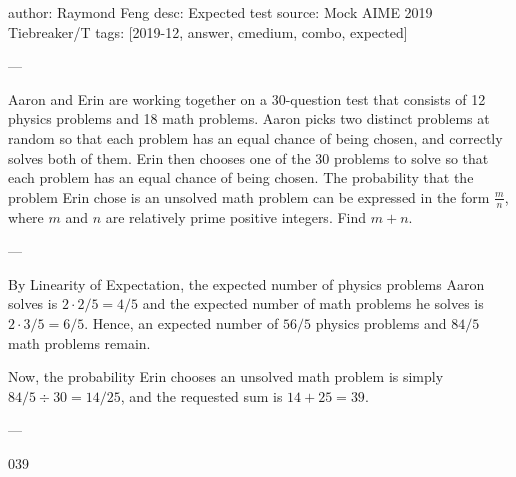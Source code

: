 author: Raymond Feng
desc: Expected test
source: Mock AIME 2019 Tiebreaker/T
tags: [2019-12, answer, cmedium, combo, expected]

---

Aaron and Erin are working together on a 30-question test that consists of 12 physics problems and 18 math problems. Aaron picks two distinct problems at random so that each problem has an equal chance of being chosen, and correctly solves both of them. Erin then chooses one of the 30 problems to solve so that each problem has an equal chance of being chosen. The probability that the problem Erin chose is an unsolved math problem can be expressed in the form $\tfrac mn$, where $m$ and $n$ are relatively prime positive integers. Find $m+n$.

---

By Linearity of Expectation, the expected number of physics problems Aaron solves is $2\cdot 2/5=4/5$ and the expected number of math problems he solves is $2\cdot 3/5=6/5$. Hence, an expected number of $56/5$ physics problems and $84/5$ math problems remain.

Now, the probability Erin chooses an unsolved math problem is simply $84/5\div 30=14/25$, and the requested sum is $14+25=39$.

---

039

